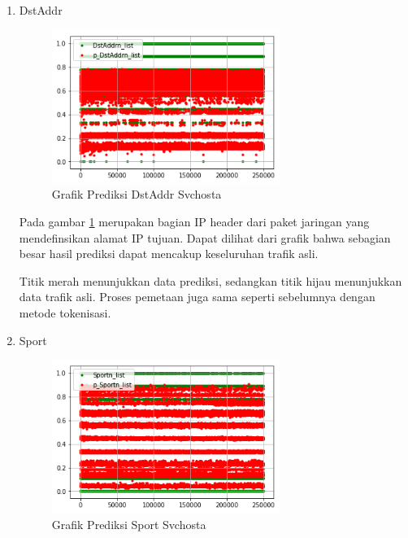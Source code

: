 \documentclass[./skripsi.tex]{subfiles}
\begin{document}
\begin{enumerate}
    \par Gambar \ref{fig:lstmm_svchosta_pred2} merupakan bagian IP header dari paket jaringan yang mendefinisikan alamat IP sumber. Dapat dilihat dari grafik bahwa sebagian besar hasil prediksi hanya mencakup nilai rendah saja, sedangkan trafik asli tersebar.
    \par Dapat diamati pada gambar bahwa titik hijau menunjukkan data asli sedangkan titik merah menunjukkan data prediksi. Proses pemetaan ip ke grafik juga sama dengan pada proto, menggunakan metode tokenisasi dimana data unik akan diberi label nilai dari rentang 0 sampai 1 berdasarkan jumlah variasinya.
    
    \item DstAddr
    \begin{figure}%
        \centering
        \includegraphics[width=0.7\textwidth]{public/assets/img/lstmm_svchosta_pred3.png}
        \caption{Grafik Prediksi DstAddr Svchosta}
        \label{fig:lstmm_svchosta_pred3}
    \end{figure}
    
    \par Pada gambar \ref{fig:lstmm_svchosta_pred3} merupakan bagian IP header dari paket jaringan yang mendefinsikan alamat IP tujuan. Dapat dilihat dari grafik bahwa sebagian besar hasil prediksi dapat mencakup keseluruhan trafik asli.
    \par Titik merah menunjukkan data prediksi, sedangkan titik hijau menunjukkan data trafik asli. Proses pemetaan juga sama seperti sebelumnya dengan metode tokenisasi.
    
    \item Sport
    \begin{figure}%
        \centering
        \includegraphics[width=0.7\textwidth]{public/assets/img/lstmm_svchosta_pred4.png}
        \caption{Grafik Prediksi Sport Svchosta}
        \label{fig:lstmm_svchosta_pred4}
    \end{figure}
    

\end{enumerate}
\end{document}
